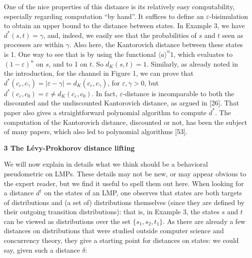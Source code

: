 \documentclass[10pt,a4paper]{article}
\begin{document}
 
 
One of the nice properties of this distance is its relatively easy computability, especially regarding computation “by hand”. It suffices to define an $\varepsilon$-bisimulation to obtain an upper bound to the distance between states. In Example 3, we have $d^{*}(s,t)=\gamma$, and, indeed, we easily see that the probabilities of $s$ and $t$ seen as processes are within $\gamma$. Also here, the Kantorovich distance between these states is 1. One way to see that is by using the functional $\langle a\rangle^{n}1$, which evaluates to $(1-\varepsilon)^{n}$ on $s$, and to 1 on $t$. So $d_{K}(s,t)=1$. Similarly, as already noted in the introduction, for the channel in Figure 1, we can prove that $d^{*}(c_{\varepsilon},c_{\gamma})=|\varepsilon-\gamma|=d_{K}(c_{\varepsilon},c_{\gamma})$, for $\varepsilon,\gamma>0$, but $d^{*}(c_{\varepsilon},c_{0})=\varepsilon\neq d_{K}(c_{\varepsilon},c_{0})$. In fact, $\varepsilon$-distance is incomparable to both the discounted and the undiscounted Kantorovich distance, as argued in [26]. That paper also gives a straightforward polynomial algorithm to compute $d^{*}$. The computation of the Kantorovich distance, discounted or not, has been the subject of many papers, which also led to polynomial algorithms [53].\par
 
 
 



 
\par\medskip\noindent\textbf{3 The Lévy-Prokhorov distance lifting}\par
 
 
We will now explain in details what we think should be a behavioral pseudometric on LMPs. These details may not be new, or may appear obvious to the expert reader, but we find it useful to spell them out here. When looking for a distance $d^{\dagger}$ on the states of an LMP, one observes that states are both targets of distributions and (a set of) distributions themselves (since they are defined by their outgoing transition distributions): that is, in Example 3, the states $s$ and $t$ can be viewed as distributions over the set $\{s_{1},s_{2},t_{1}\}$. As there are already a few distances on distributions that were studied outside computer science and concurrency theory, they give a starting point for distances on states: we could say, given such a distance $\delta$:\par
  
\end{document}

